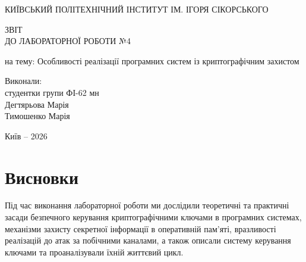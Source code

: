 \documentclass[12pt,a4paper]{article}
\begin{document}
\begin{titlepage}

\begin{center}

КИЇВСЬКИЙ ПОЛІТЕХНІЧНИЙ ІНСТИТУТ
ІМ. ІГОРЯ СІКОРСЬКОГО

\vspace{2cm}

{\large ЗВІТ}\\
{\large ДО ЛАБОРАТОРНОЇ РОБОТИ №4}

\vspace{1cm}

{\large на тему: Особливості реалізації програмних систем із криптографічним захистом}

\vspace{0.5cm}

\textbf{}

\end{center}

\vfill

\begin{flushright}
\begin{minipage}{0.4\textwidth}

Виконали:\\
студентки групи ФІ-62 мн\\
Дегтярьова Марія\\
Тимошенко Марія

\end{minipage}
\end{flushright}

\vfill

\begin{center}
Київ -- 2026
\end{center}

\end{titlepage}

\tableofcontents
\newpage









\section*{Висновки}

Під час виконання лабораторної роботи ми дослідили теоретичні та практичні засади безпечного керування
криптографічними ключами в програмних системах, механізми захисту секретної інформації в оперативній
пам'яті, вразливості реалізацій до атак за побічними каналами, а також описали систему керування ключами
та проаналізували їхній життєвий цикл.
\end{document}
